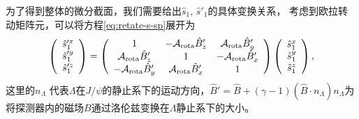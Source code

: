 为了得到整体的微分截面，我们需要给出$\hat{s}_{1}$, $\hat{s}'_{1}$的具体变换关系，
考虑到欧拉转动矩阵元，可以将方程\ref{eq:retate-s-sp}展开为
\begin{equation}
    \left(
    \begin{array} {c}
        \hat{s}'^x_{1} \\
        \hat{s}'^y_{1} \\
        \hat{s}'^z_{1} \\
    \end{array}\right)
    =
    \left(%
    \begin{array}{ccc}
        1                       & - \mathcal{A}_{\rm rota} \hat{B}'_{z}  & \mathcal{A}_{\rm rota} \hat{B}'_{y}  \\
        \mathcal{A}_{\rm rota}  \hat{B}'_{z}  & 1                       & -\mathcal{A}_{\rm rota}\hat{B}'_{x} \\
        -\mathcal{A}_{\rm rota} \hat{B}'_{y} & \mathcal{A}_{\rm rota}   \hat{B}'_{x} & 1                      \\
    \end{array}
    \right)
    \left(%
    \begin{array} {c}
        \hat{s}^x_{1} \\
        \hat{s}^y_{1} \\
        \hat{s}^z_{1} \\
    \end{array}\right),
\end{equation}
这里的$n_{\Lambda}$ 代表$\Lambda$在$J/\psi$的静止系下的运动方向，$\hat{B}'=\hat{B} + (\gamma-1) (\hat{B} \cdot n_{\Lambda}) n_{\Lambda}  $为将探测器内的磁场$B$通过洛伦兹变换在$\Lambda$静止系下的大小\cite{landau1952the}。
